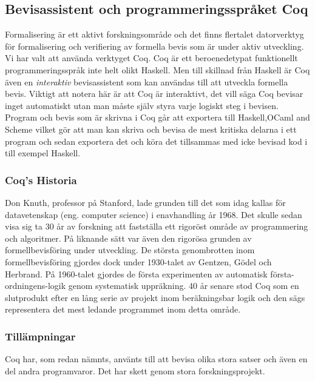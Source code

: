 \subsection{Bevisassistent och programmeringsspråket Coq}
Formalisering är ett aktivt forskningsområde och det finns flertalet
datorverktyg för formalisering och verifiering av formella bevis som är under
aktiv utveckling. Vi har valt att använda verktyget Coq. Coq är ett
beroenedetypat funktionellt programmeringsspråk inte helt olikt Haskell. Men
till skillnad från Haskell är Coq även en \emph{interaktiv} bevisassistent som
kan användas till att utveckla formella bevis. Viktigt att notera här är att
Coq är interaktivt, det vill säga Coq bevisar inget automatiskt utan man måste
själv styra varje logiskt steg i bevisen. Program och bevis som är skrivna i
Coq går att exportera till Haskell,OCaml and Scheme vilket gör att man kan
skriva och bevisa de mest kritiska delarna i ett program och sedan exportera det
och köra det tillsammas med icke bevisad kod i till exempel Haskell.

\subsubsection{Coq's Historia}
Don Knuth, professor på Stanford, lade grunden till det som idag kallas för
datavetenskap (eng. computer science) i enavhandling år 1968. Det skulle sedan
visa sig ta 30 år av forskning att fastställa ett rigoröst område av
programmering och algoritmer. På liknande sätt var även den rigorösa grunden av
formellbevisföring under utveckling. De största genombrotten inom
formellbevisföring gjordes dock under 1930-talet av Gentzen, Gödel och
Herbrand. På 1960-talet gjordes de första experimenten av automatisk
första-ordningens-logik genom systematisk uppräkning. 40 år senare stod Coq som
en slutprodukt efter en lång serie av projekt inom beräkningsbar logik och den
sägs representera det mest ledande programmet inom detta område.

\subsubsection{Tillämpningar}
Coq har, som redan nämnts, använts till att bevisa olika stora satser och även
en del andra programvaror. Det har skett genom stora forskningsprojekt.

